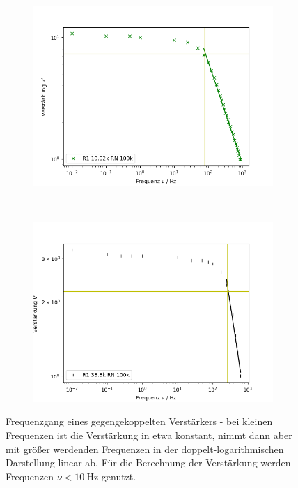 \begin{figure}[h]
\begin{subfigure}[t]{0.5\textwidth}
	\end{subfigure}
	\\
	\begin{subfigure}[t]{0.5\textwidth}
		\centering
		\includegraphics[width=\textwidth]{img/a_R1_10-02k_RN_100k.png}
	\end{subfigure}%
	~
	\begin{subfigure}[t]{0.5\textwidth}
		\centering
		\includegraphics[width=\textwidth]{img/a_R1_33-3k_RN_100k.png}
	\end{subfigure}
	\caption{Frequenzgang eines gegengekoppelten Verstärkers - bei kleinen Frequenzen ist die Verstärkung in etwa konstant, nimmt dann aber mit größer werdenden Frequenzen in der doppelt-logarithmischen Darstellung linear ab. Für die Berechnung der Verstärkung werden Frequenzen $\nu < \SI{10}{\hertz}$ genutzt.}
	\label{fig:a}
\end{figure}
